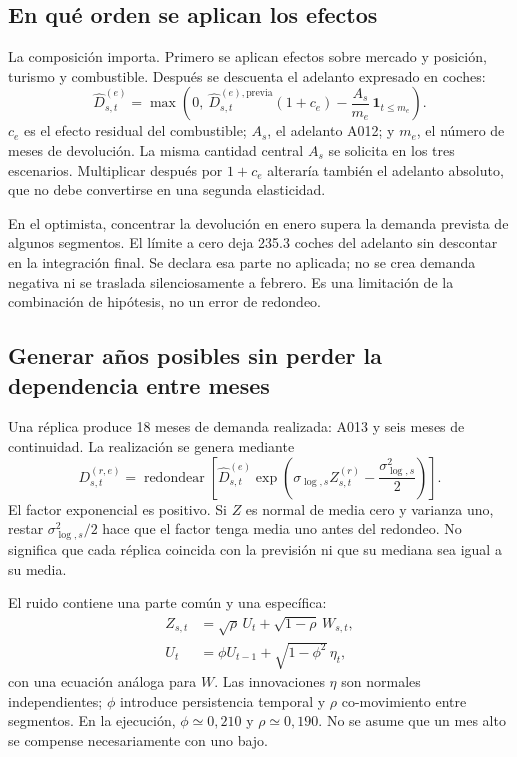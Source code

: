 \subsection{En qué orden se aplican los efectos}
La composición importa. Primero se aplican efectos sobre mercado y posición,
turismo y combustible. Después se descuenta el adelanto expresado en coches:
\begin{equation}\label{eq:demanda-escenario}
 \widehat D^{(e)}_{s,t}
 =\max\!\left(0,\ \widehat D^{(e),\mathrm{previa}}_{s,t}(1+c_e)
                       -\frac{A_s}{m_e}\,\mathbf1_{t\leq m_e}\right).
\end{equation}
$c_e$ es el efecto residual del combustible; $A_s$, el adelanto A012; y $m_e$,
el número de meses de devolución. La misma cantidad central $A_s$ se solicita
en los tres escenarios. Multiplicar después por $1+c_e$ alteraría también el
adelanto absoluto, que no debe convertirse en una segunda elasticidad.

En el optimista, concentrar la devolución en enero supera la demanda prevista
de algunos segmentos. El límite a cero deja \num{235.3} coches del adelanto sin
descontar en la integración final. Se declara esa parte no aplicada; no se crea
demanda negativa ni se traslada silenciosamente a febrero. Es una limitación de
la combinación de hipótesis, no un error de redondeo.

\subsection{Generar años posibles sin perder la dependencia entre meses}
Una réplica produce 18 meses de demanda realizada: A013 y seis meses de
continuidad. La realización se genera mediante
\begin{equation}\label{eq:ruido}
 D^{(r,e)}_{s,t}=\operatorname{redondear}
 \left[\widehat D^{(e)}_{s,t}
       \exp\!\left(\sigma_{\log,s}Z^{(r)}_{s,t}
                         -\frac{\sigma_{\log,s}^{2}}{2}\right)\right].
\end{equation}
El factor exponencial es positivo. Si $Z$ es normal de media cero y varianza uno,
restar $\sigma_{\log,s}^{2}/2$ hace que el factor tenga media uno antes del
redondeo. No significa que cada réplica coincida con la previsión ni que su
mediana sea igual a su media.

El ruido contiene una parte común y una específica:
\begin{align}
 Z_{s,t}&=\sqrt\rho\,U_t+\sqrt{1-\rho}\,W_{s,t},\\
 U_t&=\phi U_{t-1}+\sqrt{1-\phi^2}\,\eta_t,
\end{align}
con una ecuación análoga para $W$. Las innovaciones $\eta$ son normales
independientes; $\phi$ introduce persistencia temporal y $\rho$ co-movimiento
entre segmentos. En la ejecución, $\phi\simeq0{,}210$ y $\rho\simeq0{,}190$.
No se asume que un mes alto se compense necesariamente con uno bajo.


